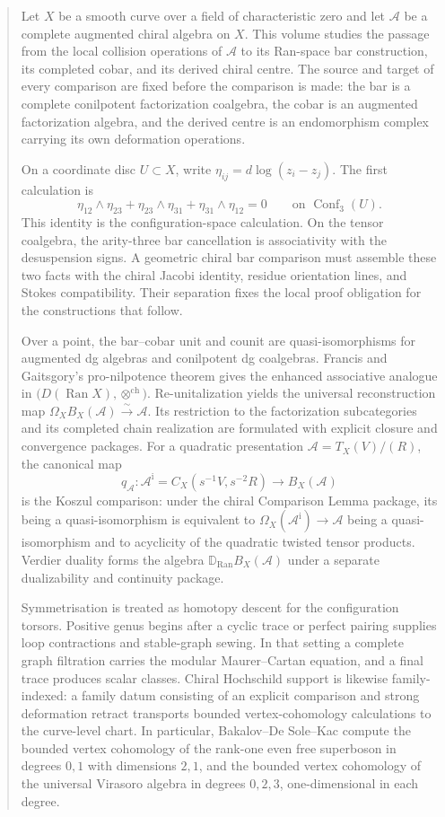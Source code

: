 \documentclass[11pt]{memoir}
\newcommand{\cA}{\mathcal{A}}
\begin{document}
\begin{abstract}
\itshape

\noindent
Let \(X\) be a smooth curve over a field of characteristic zero and
let \(\cA\) be a complete augmented chiral algebra on \(X\).  This
volume studies the passage from the local collision operations of
\(\cA\) to its Ran-space bar construction, its completed cobar, and
its derived chiral centre.  The source and target of every comparison
are fixed before the comparison is made: the bar is a complete
conilpotent factorization coalgebra, the cobar is an augmented
factorization algebra, and the derived centre is an endomorphism
complex carrying its own deformation operations.

On a coordinate disc \(U\subset X\), write
\(\eta_{ij}=d\log(z_i-z_j)\).  The first calculation is
\[
\eta_{12}\wedge\eta_{23}+\eta_{23}\wedge\eta_{31}
+\eta_{31}\wedge\eta_{12}=0
\qquad\text{on }\operatorname{Conf}_3(U).
\]
This identity is the configuration-space calculation.  On the tensor
coalgebra, the arity-three bar cancellation is associativity with the
desuspension signs.  A geometric chiral bar comparison must assemble
these two facts with the chiral Jacobi identity, residue orientation
lines, and Stokes compatibility.  Their separation fixes the local
proof obligation for the constructions that follow.

Over a point, the bar--cobar unit and counit are quasi-isomorphisms
for augmented dg algebras and conilpotent dg coalgebras.  Francis and
Gaitsgory's pro-nilpotence theorem gives the enhanced associative
analogue in
\(\bigl(D(\operatorname{Ran}X),\otimes^{\mathrm{ch}}\bigr)\).
Re-unitalization yields the
universal reconstruction map
\(\Omega_XB_X(\cA)\xrightarrow{\sim}\cA\).  Its restriction to the
factorization subcategories and its completed chain realization are
formulated with explicit closure and convergence packages.  For a
quadratic presentation
\(\cA=T_X(V)/(R)\), the canonical map
\[
 q_\cA\colon \cA^{\mathrm i}=C_X(s^{-1}V,s^{-2}R)
 \longrightarrow B_X(\cA)
\]
is the Koszul comparison: under the chiral Comparison Lemma package,
its being a quasi-isomorphism is equivalent to
\(\Omega_X(\cA^{\mathrm i})\to\cA\) being a quasi-isomorphism and to
acyclicity of the quadratic twisted tensor products.  Verdier duality
forms the algebra
\(\mathbb D_{\operatorname{Ran}}B_X(\cA)\) under a separate
dualizability and continuity package.

Symmetrisation is treated as homotopy descent for the configuration
torsors.  Positive genus begins after a cyclic trace or perfect pairing
supplies loop contractions and stable-graph sewing.  In that setting a
complete graph filtration carries the modular Maurer--Cartan equation,
and a final trace produces scalar classes.  Chiral Hochschild support is
likewise family-indexed: a family datum consisting of an explicit
comparison and strong deformation retract transports bounded
vertex-cohomology calculations to the curve-level chart.  In
particular, Bakalov--De Sole--Kac compute the bounded vertex
cohomology of the rank-one even free superboson in degrees \(0,1\)
with dimensions \(2,1\), and the bounded vertex cohomology of the
universal Virasoro algebra in degrees \(0,2,3\), one-dimensional in
each degree.


\end{abstract}
\end{document}
